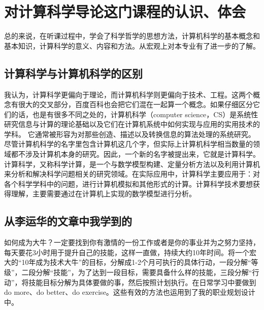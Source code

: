 \documentclass{article}
\begin{document}
\section{对计算科学导论这门课程的认识、体会}
总的来说，在听课过程中，学会了科学哲学的思想方法，计算机科学的基本概念和基本知识，计算科学的意义、内容和方法。从宏观上对本专业有了进一步的了解。\par

\subsection{计算科学与计算机科学的区别}
我认为，计算科学更偏向于理论，而计算机科学则更偏向于技术、工程。这两个概念有很大的交叉部分，百度百科也会把它们混在一起算一个概念。如果仔细区分它们的话，也是有很多不同之处的，计算机科学（computer science，CS）是系统性研究信息与计算的理论基础以及它们在计算机系统中如何实现与应用的实用技术的学科。\citep{aa} \citep{bb}它通常被形容为对那些创造、描述以及转换信息的算法处理的系统研究。尽管计算机科学的名字里包含计算机这几个字，但实际上计算机科学相当数量的领域都不涉及计算机本身的研究。因此，一个新的名字被提出来，它就是计算科学。计算科学，又称科学计算，是一个与数学模型构建、定量分析方法以及利用计算机来分析和解决科学问题相关的研究领域。在实际应用中，计算科学主要应用于：对各个科学学科中的问题，进行计算机模拟和其他形式的计算。计算科学技术要想获得理解，主要需要通过在计算机上实现的数学模型进行分析。\par


\subsection{从李运华的文章中我学到的}
如何成为大牛？一定要找到你有激情的一份工作或者是你的事业并为之努力坚持，每天要花3小时用于提升自己的技能，这样一直做，持续大约10年时间。将一个宏大的“10年成为技术大牛”的目标，分解成1-2个月可执行的具体行动，一段分解“等级”，二段分解“技能”，为了达到一段目标，需要具备什么样的技能，三段分解“行动”，将技能目标分解为具体要做的事，然后按照计划执行。在日常学习中要做到do more、do better、do exercise。这些有效的方法也运用到了我的职业规划设计中。\par
\end{document}
